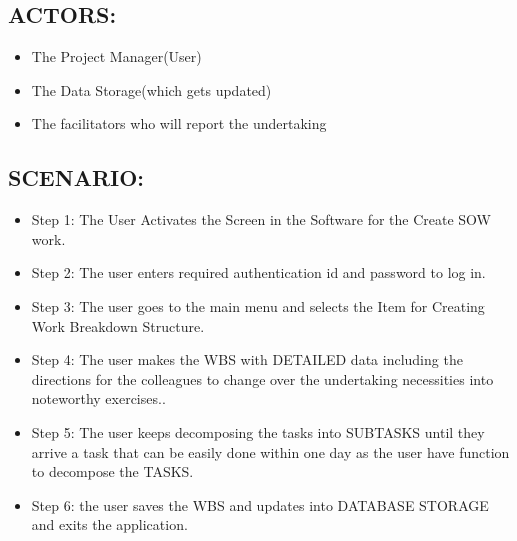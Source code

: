 \documentclass[10pt]{article}
\begin{document}
\subsection{ACTORS:}

\begin{itemize}

  \item   The Project Manager(User)

  \item  The Data Storage(which gets updated)

 \item The facilitators who will report the undertaking



\end{itemize}

						



\subsection{SCENARIO: }



\begin{itemize}

  \item Step 1: The User Activates the Screen in the Software for the Create SOW work.

  \item Step 2: The user enters required authentication id and password to log in.

  \item Step 3: The user goes to the main menu and selects the Item for Creating Work Breakdown Structure.

\item  Step 4: The user makes the WBS with DETAILED data including the directions for the colleagues to change over the undertaking necessities into noteworthy exercises..

\item Step 5: The user keeps decomposing the tasks into SUBTASKS until they arrive a task that can be easily done within one day as the user have function to decompose the TASKS.

\item Step 6: the user saves the WBS and updates into DATABASE STORAGE and exits the application. 

\end{itemize}
\end{document}
